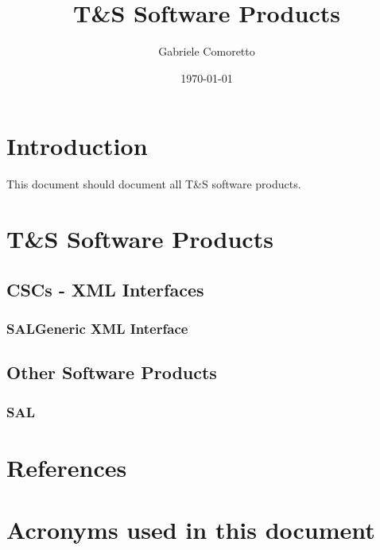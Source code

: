 \documentclass[TS,authoryear,toc,lsstdraft]{lsstdoc}
\title{T\&S Software Products}
\author{%
Gabriele Comoretto
}
\date{\today}
\begin{document}
\setDocUpstreamVersion{\vcsrevision}

\maketitle

\section{Introduction}

This document should document all T\&S software products.


\newpage
\section{T\&S Software Products}

\subsection{CSCs - XML Interfaces}

\subsubsection{SALGeneric XML Interface}



\newpage
\subsection{Other Software Products}


\subsubsection{SAL}


\appendix
\newpage
\section{References} \label{sec:bib}



\section{Acronyms used in this document}\label{sec:acronyms}

\end{document}
